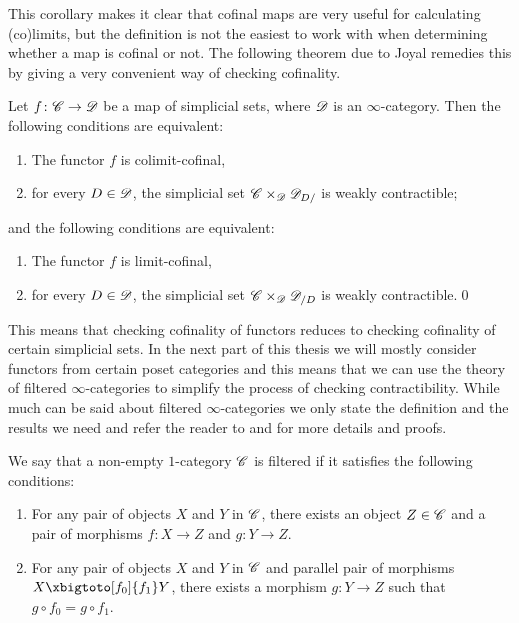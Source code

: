 \documentclass[../../thesis.tex]{subfiles}
\begin{document}
This corollary makes it clear that cofinal maps are very useful for calculating (co)limits, but the definition is not the easiest to work with when determining whether a map is cofinal or not.
The following theorem due to Joyal remedies this by giving a very convenient way of checking cofinality.
\begin{theorem}{\cite[\href{https://kerodon.net/tag/02NY}{Theorem 02NY}]{kerodon}\label{superlemma}}
    Let \(f\colon \mathscr{C} \to \mathscr{D}\) be a map of simplicial sets, where $\mathscr{D}$ is an $\infty$-category.
    Then the following conditions are equivalent:
    \begin{enumerate}
        \item The functor $f$ is colimit-cofinal,
        \item for every $D\in \mathscr{D}$, the simplicial set $\mathscr{C}\times_{\mathscr{D}} \mathscr{D}_{D/}$ is weakly contractible;
    \end{enumerate}
    and the following conditions are equivalent:
    \begin{enumerate}
        \item The functor $f$ is limit-cofinal,
        \item for every $D\in \mathscr{D}$, the simplicial set $\mathscr{C}\times_{\mathscr{D}} \mathscr{D}_{/D}$ is weakly contractible.\qed
    \end{enumerate}
\end{theorem}
This means that checking cofinality of functors reduces to checking cofinality of certain simplicial sets.
In the next part of this thesis we will mostly consider functors from certain poset categories and this means that we can use the theory of filtered $\infty$-categories to simplify the process of checking contractibility.
While much can be said about filtered $\infty$-categories we only state the definition and the results we need and refer the reader to \cite[\href{https://kerodon.net/tag/02P8}{Subsection 02P8}]{kerodon} and \cite[Section 5.3.1]{HTT} for more details and proofs.
\begin{definition}
    We say that a non-empty $1$-category $\mathscr{C}$ is filtered if it satisfies the following conditions:
    \begin{enumerate}
        \item For any pair of objects $X$ and $Y$ in $\mathscr{C}$, there exists an object $Z \in \mathscr{C}$ and a pair of morphisms $f \colon X\to Z$ and $g \colon Y\to Z$.
        \item For any pair of objects $X$ and $Y$ in $\mathscr{C}$ and parallel pair of morphisms $X \xbigtoto[f_0]{f_1} Y$, there exists a morphism $g \colon Y \to Z$ such that $g \circ f_0 = g \circ f_1$.
    \end{enumerate}
\end{definition}
\end{document}
